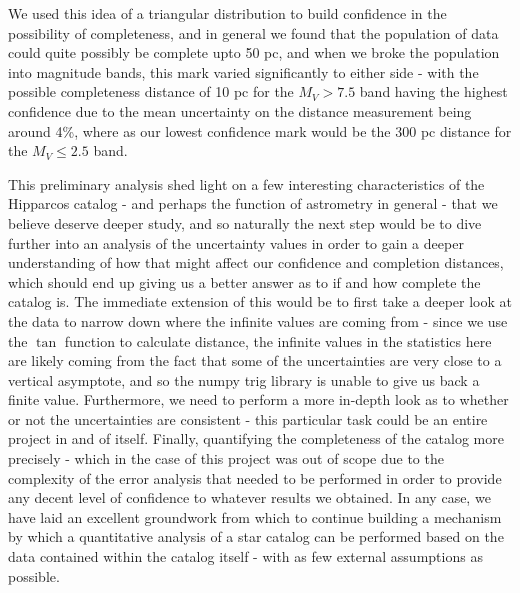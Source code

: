 \documentclass{business-covered} %
\begin{document}
		We used this idea of a triangular distribution to build confidence in the possibility of completeness, and in general we found that the population of data could quite possibly be complete upto 50 pc, and when we broke the population into magnitude bands, this mark varied significantly to either side - with the possible completeness distance of 10 pc for the $M_V>7.5$ band having the highest confidence due to the mean uncertainty on the distance measurement being around 4\%, where as our lowest confidence mark would be the 300 pc distance for the $M_V\le 2.5$ band.
		
		This preliminary analysis shed light on a few interesting characteristics of the Hipparcos catalog - and perhaps the function of astrometry in general - that we believe deserve deeper study, and so naturally the next step would be to dive further into an analysis of the uncertainty values in order to gain a deeper understanding of how that might affect our confidence and completion distances, which should end up giving us a better answer as to if and how complete the catalog is. 
		The immediate extension of this would be to first take a deeper look at the data to narrow down where the infinite values are coming from - since we use the $\tan$ function to calculate distance, the infinite values in the statistics here are likely coming from the fact that some of the uncertainties are very close to a vertical asymptote, and so the numpy trig library is unable to give us back a finite value. Furthermore, we need to perform a more in-depth look as to whether or not the uncertainties are consistent - this particular task could be an entire project in and of itself. Finally, quantifying the completeness of the catalog more precisely - which in the case of this project was out of scope due to the complexity of the error analysis that needed to be performed in order to provide any decent level of confidence to whatever results we obtained. 
		In any case, we have laid an excellent groundwork from which to continue building a mechanism by which a quantitative analysis of a star catalog can be performed based on the data contained within the catalog itself - with as few external assumptions as possible.

\pagebreak
\nocite{vizier}
\nocite{nasa}
\nocite{cosmos}
\nocite{brit}


\end{document}
